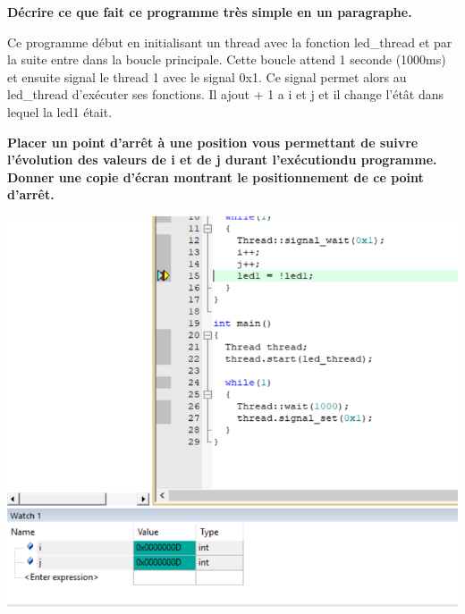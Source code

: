 \documentclass[12pt]{exam}
\begin{document}
\begin{questions}
\question \textbf{Décrire ce que fait ce programme très simple en un paragraphe.}

Ce programme début en initialisant un thread avec la fonction led\_thread et par la suite entre dans la boucle principale. Cette boucle attend 1 seconde (1000ms) et ensuite signal le thread 1 avec le signal 0x1. Ce signal permet alors au led\_thread d'exécuter ses fonctions. Il ajout + 1 a i et j et il change l'étât dans lequel la led1 était.

\question \textbf{Placer un point d’arrêt à une position vous permettant de suivre l’évolution des valeurs de i et de j durant l’exécutiondu programme. Donner une copie d’écran montrant le positionnement de ce point d’arrêt.}
\par
\centering
\includegraphics[scale=0.5]{no2}
\end{questions}
\end{document}
